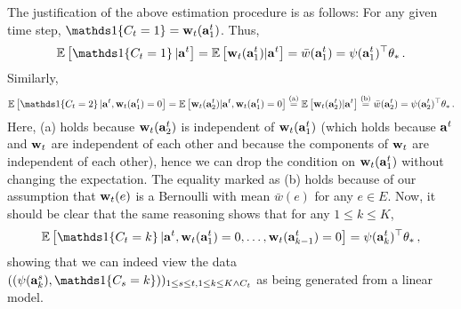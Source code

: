 The justification of the above estimation procedure is as follows:
For any given time step, $\one{C_t=1} = \rnd{w}_t(\rnd{a}^t_1)$.
Thus,
\begin{align*}
\EE{ \one{C_t=1} | \rnd{a}^t }
 =  \EE{ \rnd{w}_t(\rnd{a}^t_1) | \rnd{a}^t } 
 = \bar{w}(\rnd{a}^t_1) = \psi(\rnd{a}^t_1)^\top \thetast\,.
\end{align*}
Similarly,
\begin{align*}
\EE{ \one{C_t=2} | \rnd{a}^t, \rnd{w}_t(\rnd{a}^t_1 ) = 0 } 
=  \EE{ \rnd{w}_t(\rnd{a}^t_2) | \rnd{a}^t, \rnd{w}_t(\rnd{a}^t_1 ) = 0  }  
\stackrel{\mathrm{\footnotesize (a)}}{=} 
	  \EE{ \rnd{w}_t(\rnd{a}^t_2) | \rnd{a}^t }  
\stackrel{\mathrm{\footnotesize (b)}}{=} 
	\bar{w}(\rnd{a}^t_2) = \psi(\rnd{a}^t_2)^\top \thetast\,.
\end{align*}
Here, (a) holds because $\mathbf{w}_t(\mathbf{a}_2^t)$ is independent of $\mathbf{w}_t(\mathbf{a}_1^t)$ 
(which holds because $\mathbf{a}^t$ and $\mathbf{w}_t$ are independent of each other 
and because the components of $\mathbf{w}_t$ are independent of each other), 
hence we can drop the condition on $\mathbf{w}_t(\mathbf{a}_1^t)$ without changing the expectation.
The equality marked as (b) holds because of our assumption that $\mathbf{w}_t(e)$ is a Bernoulli with mean $\bar{w}(e)$ for any $e\in E$. Now, it should be clear that the same reasoning shows that for any $1\le k \le K$,
\begin{align*}
\EE{ \one{C_t=k} | \rnd{a}^t, \rnd{w}_t(\rnd{a}^t_1 ) = 0, \dots,  \rnd{w}_t(\rnd{a}^t_{k-1} ) = 0 } 
= \psi(\rnd{a}^t_k)^\top \thetast\,,
\end{align*}
showing that we can indeed view the data 
$( (\psi(\rnd{a}^s_k), \one{C_s=k} ) )_{1\le s\le t, 1\le k \le K \wedge C_t }$ as being generated from a linear model.

